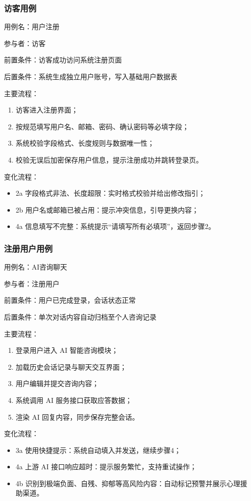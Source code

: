 \subsubsection{访客用例}

\par
\indent 用例名：用户注册
\par
\indent 参与者：访客
\par
\indent 前置条件：访客成功访问系统注册页面
\par
\indent 后置条件：系统生成独立用户账号，写入基础用户数据表
\par
\indent 主要流程：
\begin{enumerate}
    \item 访客进入注册界面；
    \item 按规范填写用户名、邮箱、密码、确认密码等必填字段；
    \item 系统校验字段格式、长度规则与数据唯一性；
    \item 校验无误后加密保存用户信息，提示注册成功并跳转登录页。
\end{enumerate}
\par
\indent 变化流程：
\begin{itemize}
    \item 2a 字段格式非法、长度超限：实时格式校验并给出修改指引；
    \item 2b 用户名或邮箱已被占用：提示冲突信息，引导更换内容；
    \item 4a 信息填写不完整：系统提示“请填写所有必填项”，返回步骤2。
\end{itemize}

\subsubsection{注册用户用例}

\par
\indent 用例名：AI咨询聊天
\par
\indent 参与者：注册用户
\par
\indent 前置条件：用户已完成登录，会话状态正常
\par
\indent 后置条件：单次对话内容自动归档至个人咨询记录
\par
\indent 主要流程：
\begin{enumerate}
    \item 登录用户进入 AI 智能咨询模块；
    \item 加载历史会话记录与聊天交互界面；
    \item 用户编辑并提交咨询内容；
    \item 系统调用 AI 服务接口获取应答数据；
    \item 渲染 AI 回复内容，同步保存完整会话。
\end{enumerate}
\par
\indent 变化流程：
\begin{itemize}
    \item 3a 使用快捷提示：系统自动填入并发送，继续步骤4；
    \item 4a 上游 AI 接口响应超时：提示服务繁忙，支持重试操作；
    \item 4b 识别到极端负面、自残、抑郁等高风险内容：自动标记预警并展示心理援助渠道。
\end{itemize}

